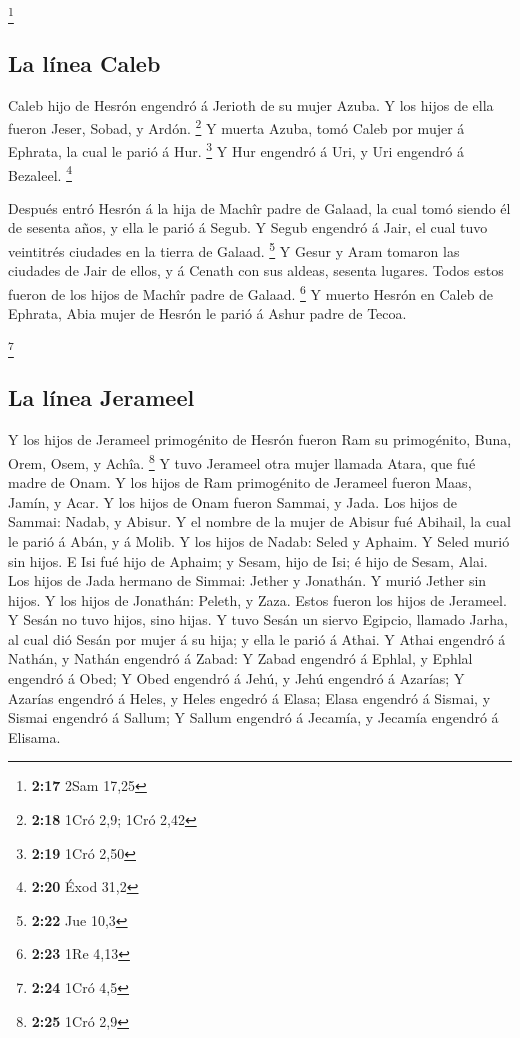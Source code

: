 \footnote{\textbf{2:17} 2Sam 17,25}

\hypertarget{la-luxednea-caleb}{%
\subsection{La línea Caleb}\label{la-luxednea-caleb}}

 Caleb hijo de Hesrón engendró á Jerioth de su mujer
Azuba. Y los hijos de ella fueron Jeser, Sobad, y Ardón. \footnote{\textbf{2:18}
  1Cró 2,9; 1Cró 2,42}  Y muerta Azuba, tomó Caleb por
mujer á Ephrata, la cual le parió á Hur. \footnote{\textbf{2:19} 1Cró
  2,50}  Y Hur engendró á Uri, y Uri engendró á Bezaleel.
\footnote{\textbf{2:20} Éxod 31,2}

 Después entró Hesrón á la hija de Machîr padre de
Galaad, la cual tomó siendo él de sesenta años, y ella le parió á Segub.
 Y Segub engendró á Jair, el cual tuvo veintitrés
ciudades en la tierra de Galaad. \footnote{\textbf{2:22} Jue 10,3}
 Y Gesur y Aram tomaron las ciudades de Jair de ellos, y
á Cenath con sus aldeas, sesenta lugares. Todos estos fueron de los
hijos de Machîr padre de Galaad. \footnote{\textbf{2:23} 1Re 4,13}
 Y muerto Hesrón en Caleb de Ephrata, Abia mujer de
Hesrón le parió á Ashur padre de Tecoa.

\footnote{\textbf{2:24} 1Cró 4,5}

\hypertarget{la-luxednea-jerameel}{%
\subsection{La línea Jerameel}\label{la-luxednea-jerameel}}

 Y los hijos de Jerameel primogénito de Hesrón fueron Ram
su primogénito, Buna, Orem, Osem, y Achîa. \footnote{\textbf{2:25} 1Cró
  2,9}  Y tuvo Jerameel otra mujer llamada Atara, que fué
madre de Onam.  Y los hijos de Ram primogénito de
Jerameel fueron Maas, Jamín, y Acar.  Y los hijos de Onam
fueron Sammai, y Jada. Los hijos de Sammai: Nadab, y Abisur.
 Y el nombre de la mujer de Abisur fué Abihail, la cual
le parió á Abán, y á Molib.  Y los hijos de Nadab: Seled
y Aphaim. Y Seled murió sin hijos.  E Isi fué hijo de
Aphaim; y Sesam, hijo de Isi; é hijo de Sesam, Alai.  Los
hijos de Jada hermano de Simmai: Jether y Jonathán. Y murió Jether sin
hijos.  Y los hijos de Jonathán: Peleth, y Zaza. Estos
fueron los hijos de Jerameel.  Y Sesán no tuvo hijos,
sino hijas.  Y tuvo Sesán un siervo Egipcio, llamado
Jarha, al cual dió Sesán por mujer á su hija; y ella le parió á Athai.
 Y Athai engendró á Nathán, y Nathán engendró á Zabad:
 Y Zabad engendró á Ephlal, y Ephlal engendró á Obed;
 Y Obed engendró á Jehú, y Jehú engendró á Azarías;
 Y Azarías engendró á Heles, y Heles engedró á Elasa;
 Elasa engendró á Sismai, y Sismai engendró á Sallum;
 Y Sallum engendró á Jecamía, y Jecamía engendró á
Elisama.

